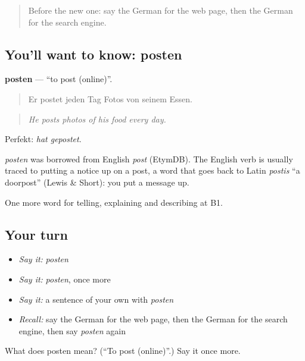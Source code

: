 \begin{quote}
Before the new one: say the German for the web page, then the German for the search engine.
\end{quote}

\subsection*{You'll want to know: posten}
\textbf{posten} — \textquotedblleft{}to post (online)\textquotedblright{}.

\begin{quote}
Er postet jeden Tag Fotos von seinem Essen.
\end{quote}

\begin{quote}
\emph{He posts photos of his food every day.}
\end{quote}

Perfekt: \emph{hat gepostet}.

\begin{cousinweb}
\emph{posten} was borrowed from English \emph{post} (EtymDB). The English verb is usually traced to putting a notice up on a post, a word that goes back to Latin \emph{postis} \textquotedblleft{}a doorpost\textquotedblright{} (Lewis \& Short): you put a message up.
\end{cousinweb}

\begin{grammarlens}[title={What you've built}]
One more word for telling, explaining and describing at B1.
\end{grammarlens}

\subsection*{Your turn}
\begin{itemize}
\raggedright
  \item \emph{Say it:} \emph{posten}
  \item \emph{Say it:} \emph{posten}, once more
  \item \emph{Say it:} a sentence of your own with \emph{posten}
  \item \emph{Recall:} say the German for the web page, then the German for the search engine, then say \emph{posten} again
\end{itemize}

\begin{tcolorbox}[breakable,colback=teal!4,colframe=teal!35!black,title={Before you move on}]
What does posten mean? (\textquotedblleft{}To post (online)\textquotedblright{}.) Say it once more.
\end{tcolorbox}
